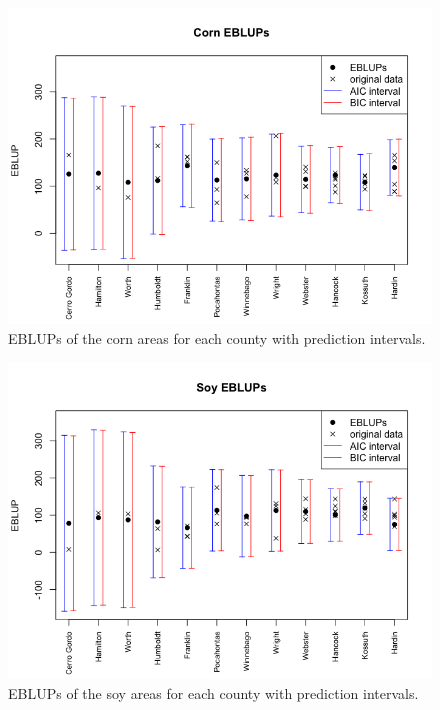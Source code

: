 \documentclass{article}
\begin{document}
\begin{figure}[H]
	\centering
	\includegraphics[scale=0.4]{cornEBLUPs2}
	\caption{EBLUPs of the corn areas for each county with prediction intervals.}
	\label{cornEBLUPs2}
\end{figure}

\begin{figure}[H]
	\centering
	\includegraphics[scale=0.4]{soyEBLUPs2}
	\caption{EBLUPs of the soy areas for each county with prediction intervals.}
	\label{soyEBLUPs2}
\end{figure}
\end{document}
